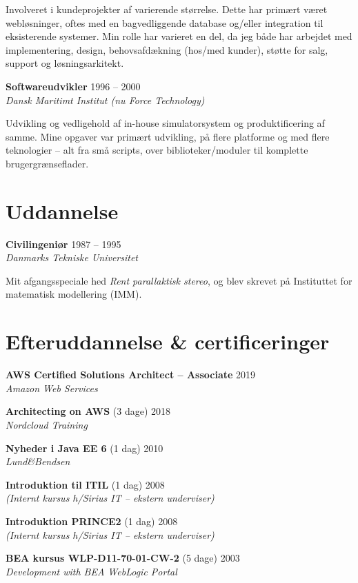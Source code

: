 \documentclass[a4paper,11pt]{article}
\begin{document}
Involveret i kundeprojekter af varierende størrelse. Dette har primært
været webløsninger, oftes med en bagvedliggende database og/eller
integration til eksisterende systemer. Min rolle har varieret en del,
da jeg både har arbejdet med implementering, design, behovsafdækning
(hos/med kunder), støtte for salg, support og løsningsarkitekt.

\smallskip

\textbf{Softwareudvikler} \hfill 1996 -- 2000 \\
\textsl{Dansk Maritimt Institut (nu Force Technology)}

Udvikling og vedligehold af in-house simulatorsystem og
produktificering af samme. Mine opgaver var primært udvikling, på
flere platforme og med flere teknologier – alt fra små scripts, over
biblioteker/moduler til komplette brugergrænseflader.


\section*{Uddannelse}

\textbf{Civilingeniør} \hfill 1987 -- 1995 \\
\textsl{Danmarks Tekniske Universitet}

Mit afgangsspeciale hed \textit{Rent parallaktisk stereo}, og blev
skrevet på Instituttet for matematisk modellering (IMM).


\section*{Efteruddannelse \& certificeringer}

\textbf{AWS Certified Solutions Architect -- Associate} \hfill 2019 \\
\textsl{Amazon Web Services}

\textbf{Architecting on AWS} \hfill (3 dage) 2018 \\
\textsl{Nordcloud Training}

\textbf{Nyheder i Java EE 6} \hfill (1 dag) 2010 \\
\textsl{Lund\&Bendsen}

\textbf{Introduktion til ITIL} \hfill (1 dag) 2008 \\
\textsl{(Internt kursus h/Sirius IT -- ekstern underviser)}

\textbf{Introduktion PRINCE2} \hfill (1 dag) 2008 \\
\textsl{(Internt kursus h/Sirius IT -- ekstern underviser)}

\textbf{BEA kursus WLP-D11-70-01-CW-2} \hfill (5 dage) 2003 \\
\textsl{Development with BEA WebLogic Portal}
\end{document}
